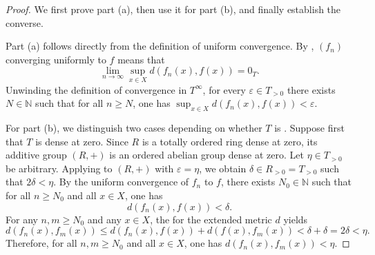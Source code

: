 \begin{proof}
    We first prove part (a), then use it for part (b), and finally establish the converse.

    Part (a) follows directly from the definition of uniform convergence. By , $(f_n)$ converging uniformly to $f$ means that
    $$\lim_{n \to \infty} \sup_{x \in X} d(f_n(x), f(x)) = 0_T.$$
    Unwinding the definition of convergence in $T^\infty$, for every $\varepsilon \in T_{>0}$ there exists $N \in \mathbb{N}$ such that for all $n \geq N$, one has $\sup_{x \in X} d(f_n(x), f(x)) < \varepsilon$. 

    For part (b), we distinguish two cases depending on whether $T$ is . Suppose first that $T$ is dense at zero. Since $R$ is a totally ordered ring dense at zero, its additive group $(R, +)$ is an ordered abelian group dense at zero. Let $\eta \in T_{>0}$ be arbitrary. Applying  to $(R, +)$ with $\varepsilon = \eta$, we obtain $\delta \in R_{>0} = T_{>0}$ such that $2\delta < \eta$. By the uniform convergence of $f_n$ to $f$, there exists $N_0 \in \mathbb{N}$ such that for all $n \geq N_0$ and all $x \in X$, one has
    $$d(f_n(x), f(x)) < \delta.$$
    For any $n,m \geq N_0$ and any $x \in X$, the  for the extended metric $d$ yields
    $$d(f_n(x), f_m(x)) \leq d(f_n(x), f(x)) + d(f(x), f_m(x)) < \delta + \delta = 2\delta < \eta.$$
    Therefore, for all $n, m \geq N_0$ and all $x \in X$, one has $d(f_n(x), f_m(x)) < \eta$.


\end{proof}
